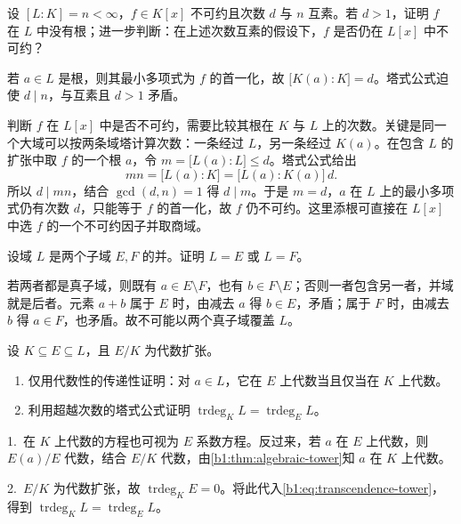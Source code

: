 \begin{exercise}\label{b1:ex:14-5}
	设 \([L:K]=n<\infty\)，\(f\in K[x]\) 不可约且次数 \(d\) 与 \(n\) 互素。若 \(d>1\)，证明 \(f\) 在 \(L\) 中没有根；进一步判断：在上述次数互素的假设下，\(f\) 是否仍在 \(L[x]\) 中不可约？
\end{exercise}
\begin{solution}
	若 \(a\in L\) 是根，则其最小多项式为 \(f\) 的首一化，故 \(\bigl[K(a):K\bigr]=d\)。塔式公式迫使 \(d\mid n\)，与互素且 \(d>1\) 矛盾。

	判断 \(f\) 在 \(L[x]\) 中是否不可约，需要比较其根在 \(K\) 与 \(L\) 上的次数。关键是同一个大域可以按两条域塔计算次数：一条经过 \(L\)，另一条经过 \(K(a)\)。在包含 \(L\) 的扩张中取 \(f\) 的一个根 \(a\)，令 \(m=\bigl[L(a):L\bigr]\leq d\)。塔式公式给出
	\[
		mn=\bigl[L(a):K\bigr]=\bigl[L(a):K(a)\bigr]\,d.
	\]
	所以 \(d\mid mn\)，结合 \(\gcd(d,n)=1\) 得 \(d\mid m\)。于是 \(m=d\)，\(a\) 在 \(L\) 上的最小多项式仍有次数 \(d\)，只能等于 \(f\) 的首一化，故 \(f\) 仍不可约。这里添根可直接在 \(L[x]\) 中选 \(f\) 的一个不可约因子并取商域。
\end{solution}

\begin{exercise}\label{b1:ex:14-6}
	设域 \(L\) 是两个子域 \(E,F\) 的并。证明 \(L=E\) 或 \(L=F\)。
\end{exercise}
\begin{solution}
	若两者都是真子域，则既有 \(a\in E\setminus F\)，也有 \(b\in F\setminus E\)；否则一者包含另一者，并域就是后者。元素 \(a+b\) 属于 \(E\) 时，由减去 \(a\) 得 \(b\in E\)，矛盾；属于 \(F\) 时，由减去 \(b\) 得 \(a\in F\)，也矛盾。故不可能以两个真子域覆盖 \(L\)。
\end{solution}

\begin{exercise}\label{b1:ex:14-7}
	设 \(K\subseteq E\subseteq L\)，且 \(E/K\) 为代数扩张。
	\begin{enumerate}
		\item 仅用代数性的传递性证明：对 \(a\in L\)，它在 \(E\) 上代数当且仅当在 \(K\) 上代数。
		\item 利用超越次数的塔式公式证明 \(\operatorname{trdeg}_K L=\operatorname{trdeg}_E L\)。
	\end{enumerate}
\end{exercise}
\begin{solution}
	1.\ 在 \(K\) 上代数的方程也可视为 \(E\) 系数方程。反过来，若 \(a\) 在 \(E\) 上代数，则 \(E(a)/E\) 代数，结合 \(E/K\) 代数，由\cref{b1:thm:algebraic-tower}知 \(a\) 在 \(K\) 上代数。

	2.\ \(E/K\) 为代数扩张，故 \(\operatorname{trdeg}_K E=0\)。将此代入\eqref{b1:eq:transcendence-tower}，得到 \(\operatorname{trdeg}_K L=\operatorname{trdeg}_E L\)。
\end{solution}


